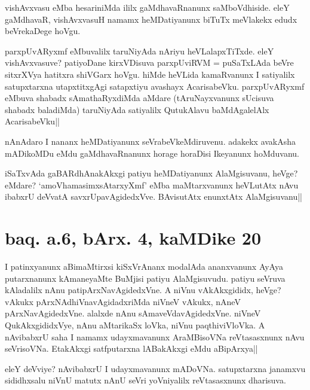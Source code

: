 
\begin{artha}
vishAvxvasu eMba hesariniMda ililx gaMdhavaRnanunx saMboVdhiside. eleY 
gaMdhavaR, vishAvxvasuH namamx heMDatiyanunx biTuTx meVlakekx edudx 
beVrekaDege hoVgu.
\end{artha}

\begin{artha}
parxpUvARyxmf eMbuvalilx taruNiyAda nAriyu heVLalapxTiTxde. eleY 
vishAvxvasuve? patiyoDane kirxVDisuva parxpUviRVM = puSaTxLAda beVre 
sitxrXVya hatitxra shiVGarx hoVgu. hiMde heVLida kamaRvanunx I 
satiyalilx satupxtarxna utapxtitxgAgi satapxtiyu avashayx 
AcarisabeVku. parxpUvARyxmf eMbuva shabadx sAmathaRyxdiMda aMdare 
(tAruNayxvanunx sUcisuva shabadx baladiMda) taruNiyAda satiyalilx 
QutukAlavu baMdAgalelAlx AcarisabeVku||
\end{artha}

\begin{artha}
nAnAdaro I nananx heMDatiyanunx seVrabeVkeMdiruvenu. adakekx avakAsha 
mADikoMDu eMdu gaMdhavaRnanunx horage horaDisi Ikeyanunx hoMduvanu.
\end{artha}

\begin{artha}
iSaTxvAda gaBARdhAnakAkxgi patiyu heMDatiyanunx AlaMgisuvanu, heVge? 
eMdare? `amoVhamasimxsAtarxyXmf' eMba maMtarxvanunx heVLutAtx nAvu 
ibabxrU deVvatA savxrUpavAgidedxVve. BAvisutAtx enunxtAtx 
AlaMgisuvanu||
\end{artha}

\section*{baq. a.6, bArx. 4, kaMDike 20}

\stext

I patinxyanunx aBimaMtirxsi kiSxVrAnanx modalAda ananxvanunx AyAya 
putarxnanunx kAmaneyaMte BuMjisi patiyu AlaMgisuvudu. patiyu seVruva 
kAladalilx nAnu patipArxNavAgidedxVne. A niVnu vAkAkxgididx, heVge? 
vAkukx pArxNAdhiVnavAgidadxriMda niVneV vAkukx, nAneV 
pArxNavAgidedxVne. alalxde nAnu sAmaveVdavAgidedxVne. niVneV 
QukAkxgididxVye, nAnu aMtarikaSx loVka, niVnu paqthiviVloVka. A 
nAvibabxrU saha I namamx udayxmavanunx AraMBisoVNa reVtasasxnunx nAvu 
seVrisoVNa. EtakAkxgi satfputarxna lABakAkxgi eMdu aBipArxya||

\begin{artha}
eleY deVviye? nAvibabxrU I udayxmavanunx mADoVNa. satupxtarxna 
janamxvu sididhxsalu niVnU matutx nAnU seVri yoVniyalilx reVtasasxnunx 
dharisuva.
\end{artha}

